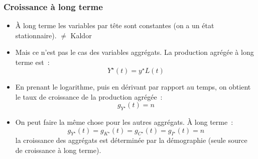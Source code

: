 \documentclass[10pt,notheorems]{beamer}
\theoremstyle{plain}
\theoremstyle{definition} %
\begin{document}
\begin{frame}
  \frametitle{Croissance à long terme}

  \bigskip

  \begin{itemize}

  \item À long terme les variables par tête sont constantes (on a un état stationnaire). {\color{red}$\neq$ Kaldor}\newline

  \item Mais ce n'est pas le cas des variables aggrégats. La production agrégée à long terme est~:
    \[
      Y^{\star}(t) = y^{\star} L(t)
    \]

    \bigskip

  \item En prenant le logarithme, puis en dérivant par rapport au temps, on obtient le taux de croissance de la production agrégée~:
    \[
      g_{Y^{\star}}(t) = n
    \]

  \item On peut faire la même chose pour les autres aggrégats. À long terme~:
    \[
      g_{Y^{\star}}(t) = g_{K^{\star}}(t) = g_{C^{\star}}(t) = g_{I^{\star}}(t) = n
    \]
    la croissance des aggrégats est déterminée par la démographie (seule source de croissance à long terme).


  \end{itemize}

\end{frame}
\end{document}

